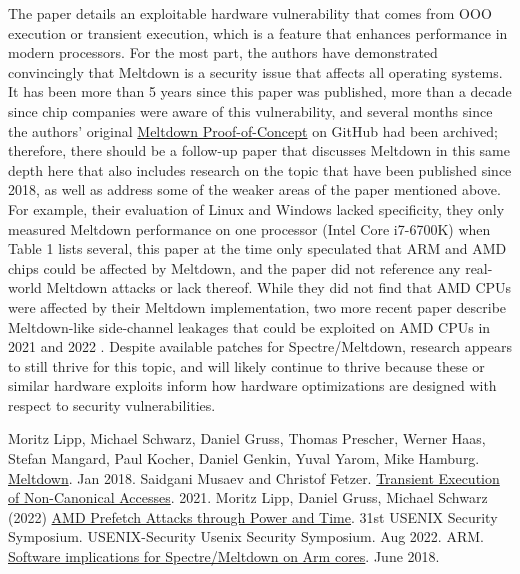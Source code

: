 \documentclass [12pt]{article}
\begin{document}
    The paper details an exploitable hardware vulnerability that comes from OOO execution or transient execution, which is a feature that enhances performance in modern processors. For the most part, the authors have demonstrated convincingly that Meltdown is a security issue that affects all operating systems. It has been more than 5 years since this paper was published, more than a decade since chip companies were aware of this vulnerability, and several months since the authors' original \href{https://github.com/IAIK/meltdown}{Meltdown Proof-of-Concept} on GitHub had been archived; therefore, there should be a follow-up paper that discusses Meltdown in this same depth here that also includes research on the topic that have been published since 2018, as well as address some of the weaker areas of the paper mentioned above. For example, their evaluation of Linux and Windows lacked specificity, they only measured Meltdown performance on one processor (Intel Core i7-6700K) when Table 1 lists several, this paper at the time only speculated that ARM and AMD chips could be affected by Meltdown, and the paper did not reference any real-world Meltdown attacks or lack thereof. While they did not find that AMD CPUs were affected by their Meltdown implementation, two more recent paper describe Meltdown-like side-channel leakages that could be exploited on AMD CPUs in 2021 \cite{2021} and 2022 \cite{2022}. Despite available patches for Spectre/Meltdown, research appears to still thrive for this topic, and will likely continue to thrive because these or similar hardware exploits inform how hardware optimizations are designed with respect to security vulnerabilities.


 
        


\begin{thebibliography}{1}
    Moritz Lipp, Michael Schwarz, Daniel Gruss, Thomas Prescher, Werner Haas, Stefan Mangard, Paul Kocher, Daniel Genkin, Yuval Yarom, Mike Hamburg. \href{https://arxiv.org/abs/1801.01207}{Meltdown}. Jan 2018.
    Saidgani Musaev and Christof Fetzer. \href{https://arxiv.org/abs/2108.10771}{Transient Execution of Non-Canonical Accesses}. 2021.
    Moritz Lipp, Daniel Gruss, Michael Schwarz  (2022) \href{https://publications.cispa.saarland/3507/}{AMD Prefetch Attacks through Power and Time}. 31st USENIX Security Symposium. USENIX-Security Usenix Security Symposium. Aug 2022.
    ARM. \href{https://developer.arm.com/documentation/102824/latest}{Software implications for Spectre/Meltdown on Arm cores}. June 2018.
\end{thebibliography}
\end{document}
